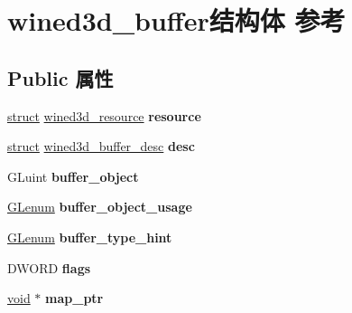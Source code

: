\hypertarget{structwined3d__buffer}{}\section{wined3d\+\_\+buffer结构体 参考}
\label{structwined3d__buffer}
\subsection*{Public 属性}
\begin{DoxyCompactItemize}
\item 
\mbox{\label{structwined3d__buffer_acea480a66e2961aa97301e4016ab1613}} 
\hyperlink{interfacestruct}{struct} \hyperlink{structwined3d__resource}{wined3d\+\_\+resource} {\bfseries resource}
\item 
\mbox{\label{structwined3d__buffer_aed7be17c2b2936d6e75ec04f388dd997}} 
\hyperlink{interfacestruct}{struct} \hyperlink{structwined3d__buffer__desc}{wined3d\+\_\+buffer\+\_\+desc} {\bfseries desc}
\item 
\mbox{\label{structwined3d__buffer_ac4d922fab6fd3df48d8f1a91daf39f57}} 
G\+Luint {\bfseries buffer\+\_\+object}
\item 
\mbox{\label{structwined3d__buffer_a79d246bd60189a61f271d0d062a767b5}} 
\hyperlink{interfacevoid}{G\+Lenum} {\bfseries buffer\+\_\+object\+\_\+usage}
\item 
\mbox{\label{structwined3d__buffer_a273a4b21736f80249c6890a5864300c8}} 
\hyperlink{interfacevoid}{G\+Lenum} {\bfseries buffer\+\_\+type\+\_\+hint}
\item 
\mbox{\label{structwined3d__buffer_a6c6bbb68542b2ed18df905f5330c67fb}} 
D\+W\+O\+RD {\bfseries flags}
\item 
\mbox{\label{structwined3d__buffer_ac941ac703698b0297e54d95dee2e272f}} 
\hyperlink{interfacevoid}{void} $\ast$ {\bfseries map\+\_\+ptr}
\item 
\mbox{\label{structwined3d__buffer_aa17a732dd41a9a9c6333fa28c76da9dd}} 

\end{DoxyCompactItemize}
